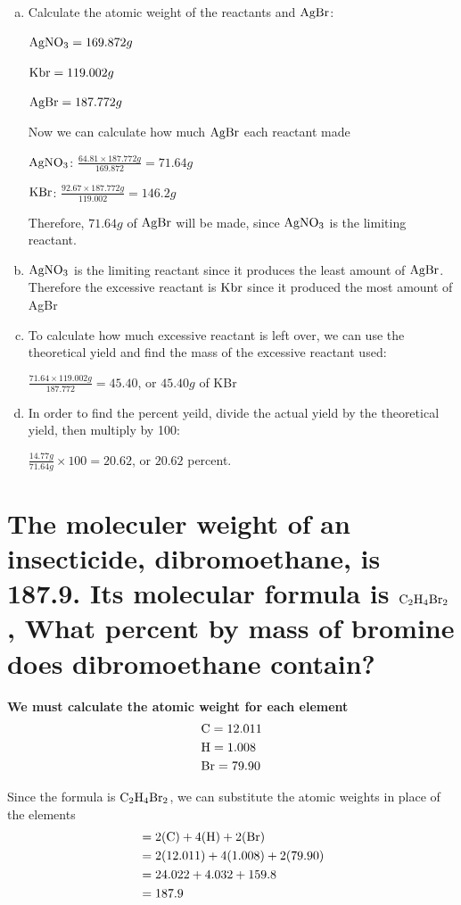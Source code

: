 \documentclass{scrartcl}
\begin{document}
\begin{enumerate}[a.]
\item Calculate the atomic weight of the reactants and \(\ce{AgBr}\):

\(\ce{AgNO3} = 169.872g\)

\(\ce{Kbr} = 119.002g\)

\(\ce{AgBr} = 187.772g\)

Now we can calculate how much \(\ce{AgBr}\) each reactant made

\(\ce{AgNO3}\): \(\frac{64.81\times187.772g}{169.872}=71.64g\)

\(\ce{KBr}\): \(\frac{92.67\times187.772g}{119.002}=146.2g\)

Therefore,   \(71.64g\) of \(\ce{AgBr}\) will be made, since \(\ce{AgNO3}\) is the limiting reactant.

\item \(\ce{AgNO3}\) is the limiting reactant since it produces the least amount of
\(\ce{AgBr}\). Therefore the excessive reactant is  \(\ce{Kbr}\) since it
produced the most amount of AgBr
\item To calculate how much excessive reactant is left over, we can use the
theoretical yield and find the mass of the excessive reactant used:

\(\frac{71.64\times119.002g}{187.772}=45.40\), or \(45.40g\) of KBr
\item In order to find the percent yeild, divide the actual yield by the
theoretical yield, then multiply by 100:

\(\frac{14.77g}{71.64g}\times100=20.62\), or \(20.62\) percent.
\end{enumerate}

\section{The moleculer weight of an insecticide, dibromoethane, is 187.9. Its molecular formula is \(\ce{C2H4Br2}\), What percent by mass of bromine does dibromoethane contain?}
\label{sec:org27b60ea}
\textbf{We must calculate the atomic weight for each element}
\begin{align*}
&\ce{C} = 12.011\\
&\ce{H} = 1.008\\
&\ce{Br} = 79.90
\end{align*}

Since the formula is  \(\ce{C2H4Br2}\), we can substitute the atomic weights in
place of the elements
\begin{align*}
&= 2(\ce{C}) + 4(\ce{H}) + 2(\ce{Br})\\
&= 2(12.011) + 4(1.008) + 2(79.90)\\
&= 24.022 + 4.032 + 159.8\\
&= 187.9
\end{align*}
\end{document}
